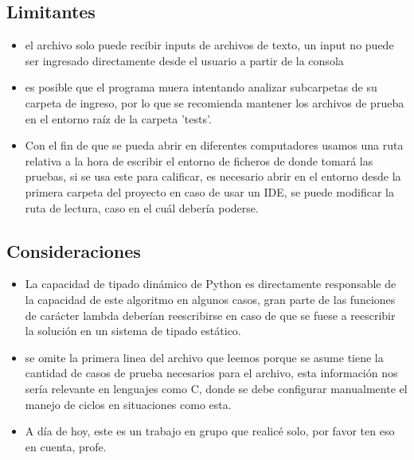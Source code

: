 \documentclass[a4paper]{article}
\begin{document}
\subsection{Limitantes}
    \begin{itemize}
        \item el archivo solo puede recibir inputs de archivos de texto, un input no
        puede ser ingresado directamente desde el usuario a partir de la consola
        \item es posible que el programa muera intentando analizar subcarpetas de su carpeta
        de ingreso, por lo que se recomienda mantener los archivos de prueba en el entorno
        raíz de la carpeta 'tests'.
        \item Con el fin de que se pueda abrir en diferentes computadores usamos una ruta relativa
        a la hora de escribir el entorno de ficheros de donde tomará las pruebas, si se usa este 
        para calificar, es necesario abrir en el entorno desde la primera carpeta del proyecto en
        caso de usar un IDE, se puede modificar la ruta de lectura, caso en el cuál debería poderse. 
    \end{itemize}
\subsection{Consideraciones}
\begin{itemize}
    \item La capacidad de tipado dinámico de Python es directamente responsable de
    la capacidad de este algoritmo en algunos casos, gran parte de las funciones
    de carácter lambda deberían reescribirse en caso de que se fuese a reescribir la solución
    en un sistema de tipado estático.
    \item se omite la primera linea del archivo que leemos porque se asume tiene la
    cantidad de casos de prueba necesarios para el archivo, esta información nos
    sería relevante en lenguajes como C, donde se debe configurar manualmente el manejo
    de ciclos en situaciones como esta.
    \item A día de hoy, este es un trabajo en grupo que realicé solo, por favor ten eso
    en cuenta, profe.
\end{itemize}
\end{document}
